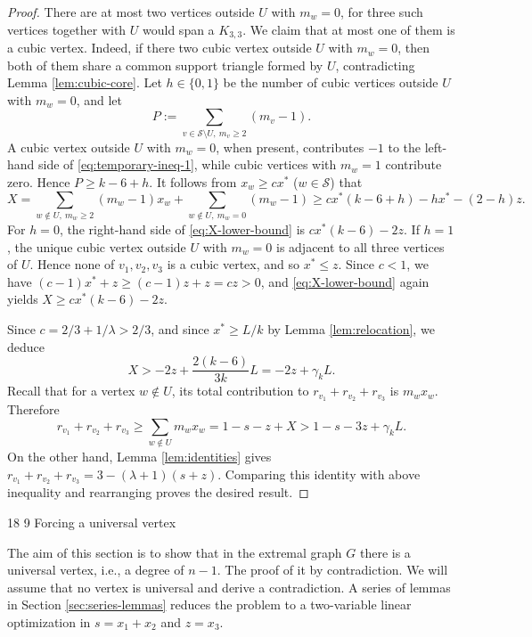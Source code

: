 \documentclass[11pt]{article}
\makeatletter
\renewcommand\section{\@startsection{section}{1}{\z@}%
{18\p@ \@plus 6\p@ \@minus 3\p@}%
{9\p@ \@plus 6\p@ \@minus 3\p@}%
{\large\bfseries\boldmath}}
\theoremstyle{plain}
\theoremstyle{definition}
\numberwithin{equation}{section}
\makeatother
\begin{document}
\begin{proof}
There are at most two vertices outside $U$ with $m_w=0$, for three
such vertices together with $U$ would span a $K_{3,3}$. 
We claim that at most one of them is a cubic vertex. Indeed, if there two cubic vertex outside 
$U$ with $m_w=0$, then both of them share a common support triangle formed by $U$,  
contradicting Lemma \ref{lem:cubic-core}. Let $h\in\{0,1\}$ be the
number of cubic vertices outside $U$ with $m_w=0$, and let
\[
P := \sum_{v\in\mathcal{S}\setminus U,~ m_v\geq 2} (m_v - 1).
\]
A cubic vertex outside $U$ with $m_w=0$, when present, contributes $-1$ to the 
left-hand side of \eqref{eq:temporary-ineq-1}, while cubic vertices with $m_w = 1$ contribute zero. 
Hence $P\geq k-6+h$. It follows from $x_w\geq cx^*$ ($w\in\mathcal{S}$) that
\begin{equation}\label{eq:X-lower-bound}
 X = \sum_{w\notin U,~m_w\geq 2} (m_w - 1)x_w + \sum_{w\notin U,~ m_w = 0} (m_w - 1) 
\geq cx^*(k - 6 + h) - hx^* - (2 - h)z.
\end{equation}
For $h=0$, the right-hand side of \eqref{eq:X-lower-bound} is $cx^*(k-6)-2z$. If $h=1$, 
the unique cubic vertex outside $U$ with $m_w=0$ is adjacent to all three vertices of $U$. 
Hence none of $v_1,v_2,v_3$ is a cubic vertex, and so $x^*\leq z$. Since $c<1$, we have 
$(c - 1)x^* + z\geq (c - 1)z + z = cz > 0$, and
\eqref{eq:X-lower-bound} again yields $X\geq cx^*(k-6)-2z$.

Since $c = 2/3 + 1/\lambda > 2/3$, and since $x^*\geq L/k$ by Lemma \ref{lem:relocation}, we deduce
\[
X > -2z + \frac{2(k-6)}{3k} L = -2z + \gamma_k L.
\]
Recall that for a vertex $w\notin U$, its total contribution to
$r_{v_1}+r_{v_2}+r_{v_3}$ is $m_wx_w$. Therefore
\[
r_{v_1}+r_{v_2}+r_{v_3}\geq \sum_{w\notin U} m_wx_w
= 1 - s - z + X > 1 - s - 3z + \gamma_k L.
\]
On the other hand, Lemma \ref{lem:identities} gives $r_{v_1} + r_{v_2} + r_{v_3} = 3 - (\lambda + 1)(s + z)$.
Comparing this identity with above inequality and rearranging proves the desired result.
\end{proof}

\section{Forcing a universal vertex}
\label{sec:first-universal-vertex}

The aim of this section is to show that in the extremal graph $G$ there is a universal vertex, 
i.e., a degree of $n-1$. The proof of it by contradiction. We will assume that no vertex is universal 
and derive a contradiction. A series of lemmas in Section \ref{sec:series-lemmas}
reduces the problem to a two-variable linear optimization in $s=x_1+x_2$ and $z=x_3$.
\end{document}
